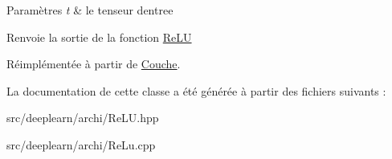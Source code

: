 \begin{DoxyParams}{Paramètres}
{\em t} & le tenseur d\textquotesingle{}entree \\
\hline
\end{DoxyParams}
\begin{DoxyReturn}{Renvoie}
la sortie de la fonction \hyperlink{classReLU}{Re\+LU} 
\end{DoxyReturn}


Réimplémentée à partir de \hyperlink{classCouche_a1f0ed59e21020f5d4f37933af4d1b1e5}{Couche}.



La documentation de cette classe a été générée à partir des fichiers suivants \+:\begin{DoxyCompactItemize}
\item 
src/deeplearn/archi/Re\+L\+U.\+hpp\item 
src/deeplearn/archi/Re\+Lu.\+cpp\end{DoxyCompactItemize}
